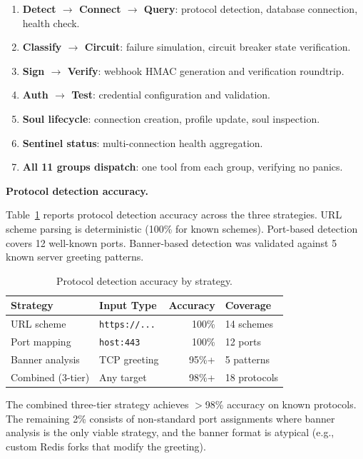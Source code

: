 \documentclass[10pt, twocolumn]{article}
\begin{document}
\begin{enumerate}[nosep, leftmargin=*]
\item \textbf{Detect $\to$ Connect $\to$ Query}: protocol detection, database connection, health check.
\item \textbf{Classify $\to$ Circuit}: failure simulation, circuit breaker state verification.
\item \textbf{Sign $\to$ Verify}: webhook HMAC generation and verification roundtrip.
\item \textbf{Auth $\to$ Test}: credential configuration and validation.
\item \textbf{Soul lifecycle}: connection creation, profile update, soul inspection.
\item \textbf{Sentinel status}: multi-connection health aggregation.
\item \textbf{All 11 groups dispatch}: one tool from each group, verifying no panics.
\end{enumerate}

\textbf{Protocol detection accuracy.}

Table~\ref{tab:detect} reports protocol detection accuracy across the three strategies. URL scheme parsing is deterministic (100\% for known schemes). Port-based detection covers 12 well-known ports. Banner-based detection was validated against 5 known server greeting patterns.

\begin{table}[h]
\caption{Protocol detection accuracy by strategy.}
\label{tab:detect}
\centering
\scriptsize
\begin{tabular}{@{}llrl@{}}
\toprule
\textbf{Strategy} & \textbf{Input Type} & \textbf{Accuracy} & \textbf{Coverage} \\
\midrule
URL scheme & \texttt{https://...} & 100\% & 14 schemes \\
Port mapping & \texttt{host:443} & 100\% & 12 ports \\
Banner analysis & TCP greeting & 95\%+ & 5 patterns \\
Combined (3-tier) & Any target & 98\%+ & 18 protocols \\
\bottomrule
\end{tabular}
\end{table}

The combined three-tier strategy achieves $>$98\% accuracy on known protocols. The remaining 2\% consists of non-standard port assignments where banner analysis is the only viable strategy, and the banner format is atypical (e.g., custom Redis forks that modify the greeting).
\end{document}
